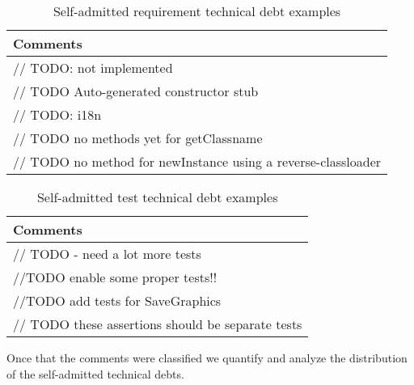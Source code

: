 \begin{table}[!hbt]
      \begin{center}
            \caption{Self-admitted requirement technical debt examples}
            \label{tab:requeriment_debt_detail}
            \begin{tabular}{l}
            \toprule
            \textbf{Comments}     \\ \midrule 
            // TODO: not implemented\\                                   
            // TODO Auto-generated constructor stub\\                                   
            // TODO: i18n\\                                   
            // TODO no methods yet for getClassname  \\                                   
            // TODO no method for newInstance using a reverse-classloader \\ \bottomrule
            \end{tabular}
      \end{center}
\end{table}

\begin{table}[!hbt]
      \begin{center}
            \caption{Self-admitted test technical debt examples}
            \label{tab:test_debt_detail}
            \begin{tabular}{l}
            \toprule
            \textbf{Comments}     \\ \midrule 
            // TODO - need a lot more tests\\                                   
            //TODO enable some proper tests!!\\                                   
            //TODO add tests for SaveGraphics\\                                   
            // TODO these assertions should be separate tests\\ \bottomrule
            \end{tabular}
      \end{center}
\end{table}

Once that the comments were classified we quantify and analyze the distribution of the self-admitted technical debts. 


